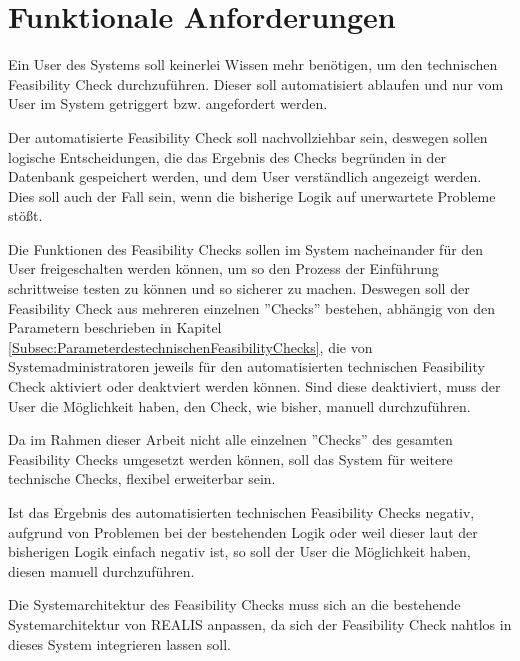 \section{Funktionale Anforderungen}
Ein User des Systems soll keinerlei Wissen mehr benötigen, um den technischen Feasibility Check durchzuführen. Dieser soll automatisiert ablaufen und nur vom User im System getriggert bzw. angefordert werden.

Der automatisierte Feasibility Check soll nachvollziehbar sein, deswegen sollen logische Entscheidungen, die das Ergebnis des Checks begründen in der Datenbank gespeichert werden, und dem User verständlich angezeigt werden. Dies soll auch der Fall sein, wenn die bisherige Logik auf unerwartete Probleme stößt.

Die Funktionen des Feasibility Checks sollen im System nacheinander für den User freigeschalten werden können, um so den Prozess der Einführung schrittweise testen zu können und so sicherer zu machen.
Deswegen soll der Feasibility Check aus mehreren einzelnen ''Checks'' bestehen, abhängig von den Parametern beschrieben in Kapitel \ref{Subsec:ParameterdestechnischenFeasibilityChecks}, die von Systemadministratoren jeweils für den automatisierten technischen Feasibility Check aktiviert oder deaktviert werden können. Sind diese deaktiviert, muss der User die Möglichkeit haben, den Check, wie bisher, manuell durchzuführen.

Da im Rahmen dieser Arbeit nicht alle einzelnen ''Checks'' des gesamten Feasibility Checks umgesetzt werden können, soll das System für weitere technische Checks, flexibel erweiterbar sein.

Ist das Ergebnis des automatisierten technischen Feasibility Checks negativ, aufgrund von Problemen bei der bestehenden Logik oder weil dieser laut der bisherigen Logik einfach negativ ist, so soll der User die Möglichkeit haben, diesen manuell durchzuführen.

Die Systemarchitektur des Feasibility Checks muss sich an die bestehende Systemarchitektur von \gls{REALIS} anpassen, da sich der Feasibility Check nahtlos in dieses System integrieren lassen soll.
